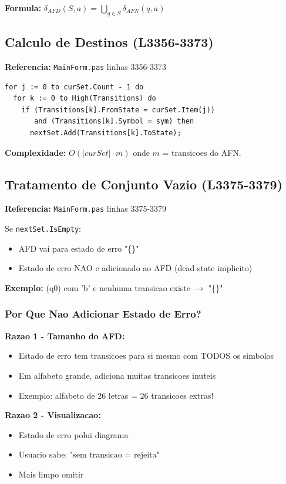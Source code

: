 \documentclass[12pt,a4paper]{article}
\begin{document}
\textbf{Formula:} $\delta_{AFD}(S, a) = \bigcup_{q \in S} \delta_{AFN}(q, a)$

\subsection{Calculo de Destinos (L3356-3373)}

\textbf{Referencia:} \texttt{MainForm.pas} linhas 3356-3373

\begin{lstlisting}[style=pascal]
for j := 0 to curSet.Count - 1 do
  for k := 0 to High(Transitions) do
    if (Transitions[k].FromState = curSet.Item(j))
       and (Transitions[k].Symbol = sym) then
      nextSet.Add(Transitions[k].ToState);
\end{lstlisting}

\textbf{Complexidade:} $O(|curSet| \cdot m)$ onde $m$ = transicoes do AFN.

\subsection{Tratamento de Conjunto Vazio (L3375-3379)}

\textbf{Referencia:} \texttt{MainForm.pas} linhas 3375-3379

Se \texttt{nextSet.IsEmpty}:
\begin{itemize}
    \item AFD vai para estado de erro "\{\}"
    \item Estado de erro NAO e adicionado ao AFD (dead state implicito)
\end{itemize}

\textbf{Exemplo:} (q0) com 'b' e nenhuma transicao existe $\rightarrow$ "\{\}"

\subsubsection{Por Que Nao Adicionar Estado de Erro?}

\textbf{Razao 1 - Tamanho do AFD:}
\begin{itemize}
    \item Estado de erro tem transicoes para si mesmo com TODOS os simbolos
    \item Em alfabeto grande, adiciona muitas transicoes inuteis
    \item Exemplo: alfabeto de 26 letras = 26 transicoes extras!
\end{itemize}

\textbf{Razao 2 - Visualizacao:}
\begin{itemize}
    \item Estado de erro polui diagrama
    \item Usuario sabe: "sem transicao = rejeita"
    \item Mais limpo omitir
\end{itemize}
\end{document}

